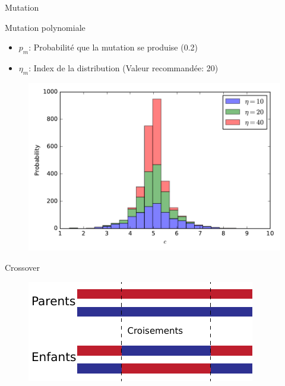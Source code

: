 \begin{frame}{Mutation}
	\begin{block}{Mutation polynomiale}
		\begin{itemize}
			\item $p_m$: Probabilité que la mutation se produise (0.2)
			\item $\eta_m$: Index de la distribution (Valeur recommandée: 20)
		\end{itemize}
	\end{block}
	\begin{figure}
		\centering
		\includegraphics[scale=.5]{figures/mutation_eta.pdf}
	\end{figure}

\end{frame}

\begin{frame}{Crossover}
	\begin{figure}[ht]
	  \centering
	  \includegraphics[scale=1]{../img/crossover.pdf}
	\end{figure}
\end{frame}